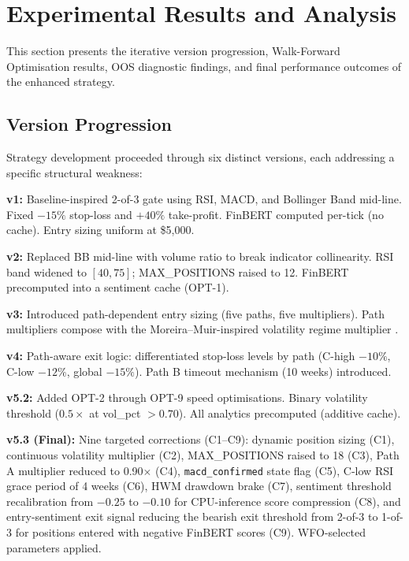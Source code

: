 \documentclass[11pt,twoside,a4paper]{article}
\begin{document}
\clearpage
\section{Experimental Results and Analysis}

This section presents the iterative version progression, Walk-Forward Optimisation results, OOS diagnostic findings, and final performance outcomes of the enhanced strategy.

\subsection{Version Progression}
\label{sec:version-progression}

Strategy development proceeded through six distinct versions, each addressing a specific structural weakness:

\textbf{v1:} Baseline-inspired 2-of-3 gate using RSI, MACD, and Bollinger Band mid-line. Fixed $-15\%$ stop-loss and $+40\%$ take-profit. FinBERT computed per-tick (no cache). Entry sizing uniform at \$5,000.

\textbf{v2:} Replaced BB mid-line with volume ratio to break indicator collinearity. RSI band widened to $[40, 75]$; MAX\_POSITIONS raised to 12. FinBERT precomputed into a sentiment cache (OPT-1).

\textbf{v3:} Introduced path-dependent entry sizing (five paths, five multipliers). Path multipliers compose with the Moreira--Muir-inspired volatility regime multiplier \citep{Moreira2017}.

\textbf{v4:} Path-aware exit logic: differentiated stop-loss levels by path (C-high $-10\%$, C-low $-12\%$, global $-15\%$). Path B timeout mechanism (10 weeks) introduced.

\textbf{v5.2:} Added OPT-2 through OPT-9 speed optimisations. Binary volatility threshold ($0.5\times$ at vol\_pct $> 0.70$). All analytics precomputed (additive cache).

\textbf{v5.3 (Final):} Nine targeted corrections (C1--C9): dynamic position sizing (C1), continuous volatility multiplier (C2), MAX\_POSITIONS raised to 18 (C3), Path A multiplier reduced to 0.90$\times$ (C4), \texttt{macd\_confirmed} state flag (C5), C-low RSI grace period of 4 weeks (C6), HWM drawdown brake (C7), sentiment threshold recalibration from $-0.25$ to $-0.10$ for CPU-inference score compression (C8), and entry-sentiment exit signal reducing the bearish exit threshold from 2-of-3 to 1-of-3 for positions entered with negative FinBERT scores (C9). WFO-selected parameters applied.
\end{document}

